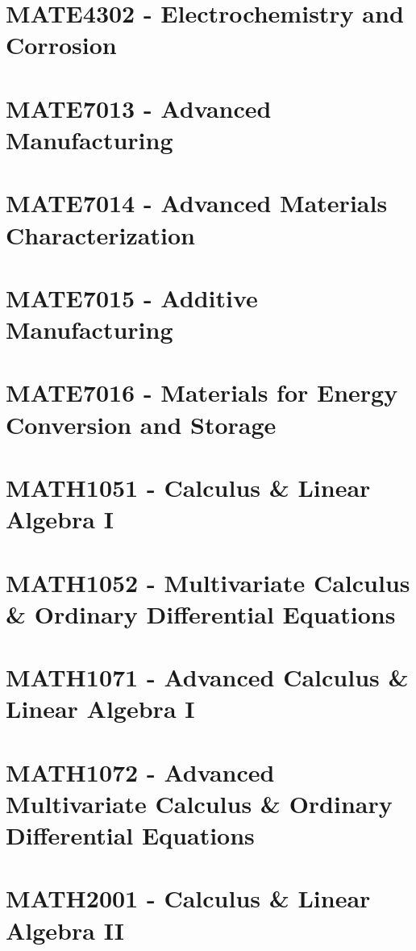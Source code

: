 \documentclass[a4paper,12pt]{report}
\begin{document}
\hypertarget{MATE4302}{\section{MATE4302 - Electrochemistry and Corrosion}}

\hypertarget{MATE7013}{\section{MATE7013 - Advanced Manufacturing}}

\hypertarget{MATE7014}{\section{MATE7014 - Advanced Materials Characterization}}

\hypertarget{MATE7015}{\section{MATE7015 - Additive Manufacturing}}

\hypertarget{MATE7016}{\section{MATE7016 - Materials for Energy Conversion and Storage}}

\hypertarget{MATH1051}{\section{MATH1051 - Calculus \& Linear Algebra I}}

\hypertarget{MATH1052}{\section{MATH1052 - Multivariate Calculus \& Ordinary Differential Equations}}

\hypertarget{MATH1071}{\section{MATH1071 - Advanced Calculus \& Linear Algebra I}}

\hypertarget{MATH1072}{\section{MATH1072 - Advanced Multivariate Calculus \& Ordinary Differential Equations}}

\hypertarget{MATH2001}{\section{MATH2001 - Calculus \& Linear Algebra II}}
\end{document}
